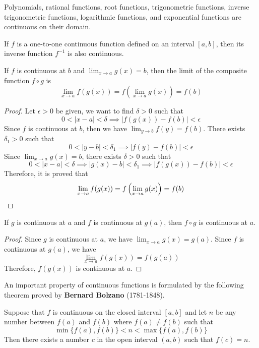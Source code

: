 \begin{theorem}
    Polynomials, rational functions, root functions, trigonometric
    functions, inverse trigonometric functions, logarithmic functions, and
    exponential functions are continuous on their domain.
\end{theorem}
\begin{theorem}
    If \(f\) is a one-to-one continuous function defined on an interval
    \([a,b]\), then its inverse function \(f^{-1}\) is also continuous.
\end{theorem}
\begin{theorem}
    If \(f\) is continuous at \(b\) and \(\lim_{x\to a}g(x)=b\), then
    the limit of the composite function \(f\circ g\) is
    \[\lim_{x\to a}f(g(x))=f\left(\lim_{x\to a}g(x)\right)=f(b)\]
\end{theorem}
\begin{proof}
    Let \(\epsilon>0\) be given, we want to find \(\delta>0\) such that
    \[0<|x-a|<\delta\implies|f(g(x))-f(b)|<\epsilon\]
    Since \(f\) is continuous at \(b\), then we have \(\lim_{y\to b}f(y)=f(b)\).
    There exists \(\delta_1>0\) such that
    \[0<|y-b|<\delta_1\implies|f(y)-f(b)|<\epsilon\]
    Since \(\lim_{x\to a}g(x)=b\), there exists \(\delta>0\) such that
    \[0<|x-a|<\delta\implies|g(x)-b|<\delta_1\implies|f(g(x))-f(b)|<\epsilon\]
    Therefore, it is proved that
    \[\lim_{x\to a}f(g(x))=f\left(\lim_{x\to a}g(x)\right)=f(b)\qedhere\]
\end{proof}
\begin{theorem}
    If \(g\) is continuous at \(a\) and \(f\) is continuous at \(g(a)\), then
    \(f\circ g\) is continuous at \(a\).
\end{theorem}
\begin{proof}
    Since \(g\) is continuous at \(a\), we have \(\lim_{x\to a}g(x)=g(a)\).
    Since \(f\) is continuous at \(g(a)\), we have
    \[\lim_{x\to a}f(g(x))=f(g(a))\]
    Therefore, \(f(g(x))\) is continuous at \(a\).
\end{proof}
An important property of continuous functions is formulated by the following
theorem proved by \textbf{Bernard Bolzano} (1781-1848).
\begin{theorem}
    Suppose that \(f\) is continuous on the closed interval \([a,b]\) and let
    \(n\) be any number between \(f(a)\) and \(f(b)\) where \(f(a)\neq f(b)\)
    such that \[\min\{f(a),f(b)\}<n<\max\{f(a),f(b)\}\]
    Then there exists a number \(c\) in the open interval \((a,b)\) such that
    \(f(c)=n\).
\end{theorem}